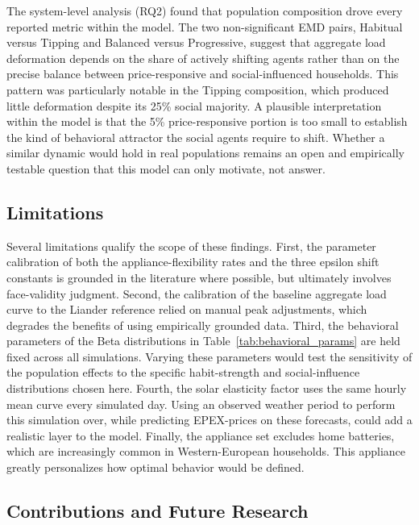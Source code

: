 \documentclass[11pt, a4paper]{article}
\begin{document}
The system-level analysis (RQ2) found that population composition drove every reported metric within the model. The two non-significant EMD pairs, Habitual versus Tipping and Balanced versus Progressive, suggest that aggregate load deformation depends on the share of actively shifting agents rather than on the precise balance between price-responsive and social-influenced households. This pattern was particularly notable in the Tipping composition, which produced little deformation despite its 25\% social majority. A plausible interpretation within the model is that the 5\% price-responsive portion is too small to establish the kind of behavioral attractor the social agents require to shift. Whether a similar dynamic would hold in real populations remains an open and empirically testable question that this model can only motivate, not answer.
 
\subsection{Limitations}
 
Several limitations qualify the scope of these findings. First, the parameter calibration of both the appliance-flexibility rates and the three epsilon shift constants is grounded in the literature where possible, but ultimately involves face-validity judgment. Second, the calibration of the baseline aggregate load curve to the Liander reference relied on manual peak adjustments, which degrades the benefits of using empirically grounded data. Third, the behavioral parameters of the Beta distributions in Table~\ref{tab:behavioral_params} are held fixed across all simulations. Varying these parameters would test the sensitivity of the population effects to the specific habit-strength and social-influence distributions chosen here. Fourth, the solar elasticity factor uses the same hourly mean curve every simulated day. Using an observed weather period to perform this simulation over, while predicting EPEX-prices on these forecasts, could add a realistic layer to the model.  Finally, the appliance set excludes home batteries, which are increasingly common in Western-European households. This appliance greatly personalizes how optimal behavior would be defined.  
 
\subsection{Contributions and Future Research}
 
\end{document}
